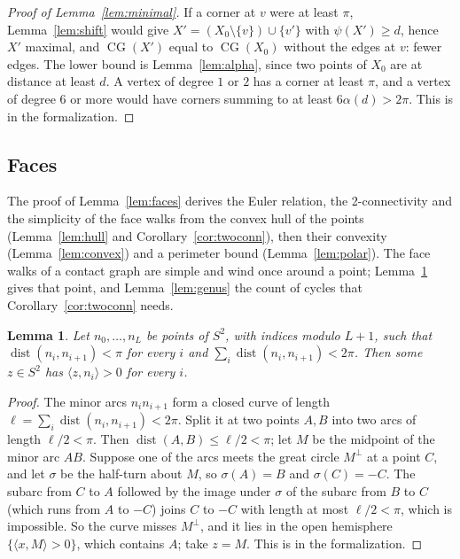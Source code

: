 \documentclass[12pt]{amsart}
\newtheorem{lemma}[theorem]{Lemma}
\theoremstyle{definition}
\theoremstyle{plain}
\theoremstyle{definition}
\newcommand{\Sph}{S^2}
\newcommand{\dist}{\operatorname{dist}}
\newcommand{\CG}{\operatorname{CG}}
\newcommand{\leanmap}[1]{\ignorespaces}
\newcommand{\mapnote}[1]{\ignorespaces}
\begin{document}
\begin{proof}[Proof of Lemma~\ref{lem:minimal}]
If a corner at $v$ were at least $\pi$, Lemma~\ref{lem:shift} would give $X'=(X_0\setminus\{v\})\cup\{v'\}$ with $\psi(X')\ge d$, hence $X'$ maximal, and $\CG(X')$ equal to $\CG(X_0)$ without the edges at $v$: fewer edges. The lower bound is Lemma~\ref{lem:alpha}, since two points of $X_0$ are at distance at least $d$. A vertex of degree $1$ or $2$ has a corner at least $\pi$, and a vertex of degree $6$ or more would have corners summing to at least $6\alpha(d)>2\pi$. This is  in the formalization.
\end{proof}

\subsection{Faces}
The proof of Lemma~\ref{lem:faces} derives the Euler relation, the 2-connectivity and the simplicity of the face walks from the convex hull of the points (Lemma~\ref{lem:hull} and Corollary~\ref{cor:twoconn}), then their convexity (Lemma~\ref{lem:convex}) and a perimeter bound (Lemma~\ref{lem:polar}). The face walks of a contact graph are simple and wind once around a point; Lemma~\ref{lem:hemi} gives that point, and Lemma~\ref{lem:genus} the count of cycles that Corollary~\ref{cor:twoconn} needs.

\begin{lemma}\label{lem:hemi}\leanmap{Tammes15.polygon_hemisphere}\mapnote{for closed polygons with sides shorter than $\pi$, whose vertices lie in an open hemisphere}
Let $n_0,\dots,n_L$ be points of $\Sph$, with indices modulo $L+1$, such that $\dist(n_i,n_{i+1})<\pi$ for every $i$ and $\sum_i\dist(n_i,n_{i+1})<2\pi$. Then some $z\in\Sph$ has $\langle z,n_i\rangle>0$ for every $i$.
\end{lemma}

\begin{proof}
The minor arcs $n_in_{i+1}$ form a closed curve of length $\ell=\sum_i\dist(n_i,n_{i+1})<2\pi$. Split it at two points $A,B$ into two arcs of length $\ell/2<\pi$. Then $\dist(A,B)\le\ell/2<\pi$; let $M$ be the midpoint of the minor arc $AB$. Suppose one of the arcs meets the great circle $M^\perp$ at a point $C$, and let $\sigma$ be the half-turn about $M$, so $\sigma(A)=B$ and $\sigma(C)=-C$. The subarc from $C$ to $A$ followed by the image under $\sigma$ of the subarc from $B$ to $C$ (which runs from $A$ to $-C$) joins $C$ to $-C$ with length at most $\ell/2<\pi$, which is impossible. So the curve misses $M^\perp$, and it lies in the open hemisphere $\{\langle x,M\rangle>0\}$, which contains $A$; take $z=M$. This is  in the formalization.
\end{proof}
\end{document}
